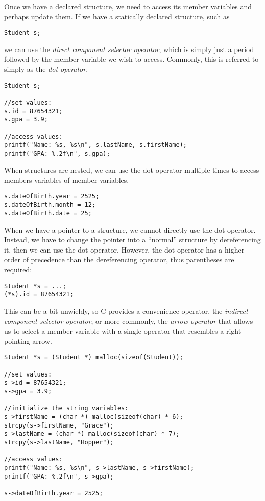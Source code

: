 Once we have a declared structure, we need to access its member
variables and perhaps update them.  If we have a statically declared
structure, such as

\texttt{Student s;} 

we can use the \emph{direct component selector operator}, which is
simply just a period followed by the member variable we wish to 
access.  Commonly, this is referred to simply as the 
 \emph{dot operator}.

\begin{verbatim}
Student s;

//set values:
s.id = 87654321;
s.gpa = 3.9;

//access values:
printf("Name: %s, %s\n", s.lastName, s.firstName);
printf("GPA: %.2f\n", s.gpa);
\end{verbatim}

When structures are nested, we can use the dot operator multiple
times to access members variables of member variables.

\begin{verbatim}
s.dateOfBirth.year = 2525;
s.dateOfBirth.month = 12;
s.dateOfBirth.date = 25;
\end{verbatim}

When we have a pointer to a structure, we cannot directly use
the dot operator.  Instead, we have to change the pointer into
a ``normal'' structure by dereferencing it, then we can use the
dot operator.  However, the dot operator has a higher order of
precedence than the dereferencing operator, thus parentheses are 
required:

\begin{verbatim}
Student *s = ...;
(*s).id = 87654321;
\end{verbatim}

This can be a bit unwieldy, so C provides a convenience operator, 
the \emph{indirect component selector operator}, or more commonly,
the  \emph{arrow operator} that allows us 
to select a member variable
with a single operator that resembles a right-pointing arrow.

\begin{verbatim}
Student *s = (Student *) malloc(sizeof(Student));

//set values:
s->id = 87654321;
s->gpa = 3.9;

//initialize the string variables:
s->firstName = (char *) malloc(sizeof(char) * 6);
strcpy(s->firstName, "Grace");
s->lastName = (char *) malloc(sizeof(char) * 7);
strcpy(s->lastName, "Hopper");

//access values:
printf("Name: %s, %s\n", s->lastName, s->firstName);
printf("GPA: %.2f\n", s->gpa);

s->dateOfBirth.year = 2525;
\end{verbatim}

